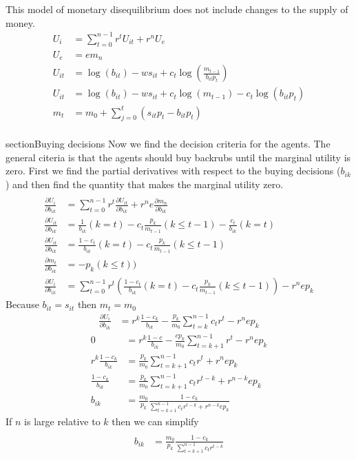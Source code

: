 \documentclass[14pt]{article} \usepackage{amsmath}
\begin{document}
This model of monetary disequilibrium does not include changes to the supply of money.  
\begin{align} 
	U_i &= \sum\limits_{t=0}^{n-1} r^t U_{it} + r^n U_e
	\\U_e &=  e m_n 
	\\U_{it} &= \log(b_{it}) - w s_{it} + c_t \log(\frac{m_{t-1}}{b_{it} p_t})
	\\ U_{it} &= \log(b_{it}) - w s_{it} + c_t \log(m_{t-1}) - c_t \log(b_{it} p_t)
	\\ m_t &= m_0 + \sum\limits_{j=0}^t (s_{it} p_t -b_{it} p_t)
\end{align}
\\section{Buying decisions}
Now we find the decision criteria for the agents. 
The general citeria is that the agents should buy backrubs until the marginal utility is zero.
First we find the partial derivatives with respect to the buying decisions ($b_{ik}$) and then find the quantity that makes the marginal utility zero.
\begin{align}
	\\\frac{ \partial U_i}{\partial b_{ik}} &= \sum\limits_{t=0}^{n-1} r^t \frac{\partial U_{it}}{\partial b_{ik}} + r^n e \frac{\partial m_n}{\partial b_{ik}} 
	\\\frac{\partial U_{it}}{\partial b_{ik}} &= \frac{1}{b_{ik}} (k = t)-c_t \frac{p_k}{m_{t-1}} (k \leq t-1) - \frac{c_t}{b_{ik}} (k = t) 
	\\\frac{\partial U_{it}}{\partial b_{ik}} &= \frac{1-c_t}{b_{ik}} (k = t)-c_t\frac{p_k}{m_{t-1}} (k \leq t-1) 
	\\\frac{\partial m_t}{\partial b_{ik}} &= -p_k(k \leq t)) 
	\\\frac{\partial U_i}{\partial b_{ik}} &= \sum\limits_{t=0}^{n-1} r^t(\frac{1-c_t}{b_{ik}} (k = t)-c_t\frac{p_k}{m_{t-1}} (k \leq t-1)) - r^n e p_k 
\end{align}
Because $b_{it} = s_{it}$ then $m_t = m_0$ 
\begin{align}
	\frac{\partial U_i}{\partial b_{ik}} &= r^k\frac{1-c_k}{b_{ik}} - \frac{p_k}{m_0} \sum\limits_{t=k}^{n-1} c_t r^t - r^n e p_k
\end{align}
\begin{align}
 	0 &= r^k\frac{1-c}{b_{ik}} - \frac{c p_k}{m_0} \sum\limits_{t=k+1}^{n-1} r^t - r^n e p_k 
 	\\r^k\frac{1-c_k}{b_{ik}} &=  \frac{p_k}{m_0} \sum\limits_{t=k+1}^{n-1} c_t r^t + r^n e p_k 
 	\\\frac{1-c_k}{b_{ik}} &=  \frac{p_k}{m_0} \sum\limits_{t=k+1}^{n-1} c_t r^{t-k} + r^{n-k} e p_k 
 	\\b_{ik} &=  \frac{m_0}{p_k} \frac {1-c_k}{\sum\limits_{t=k+1}^{n-1} c_t r^{t-k} + r^{n-k} e p_k} 
\end{align}
If $n$ is large relative to $k$ then we can simplify 
\begin{align}
 	\\b_{ik} &=  \frac{m_0}{p_k} \frac {1-c_k}{\sum\limits_{t=k+1}^{n-1} c_t r^{t-k}} 
\end{align}
\end{document}
